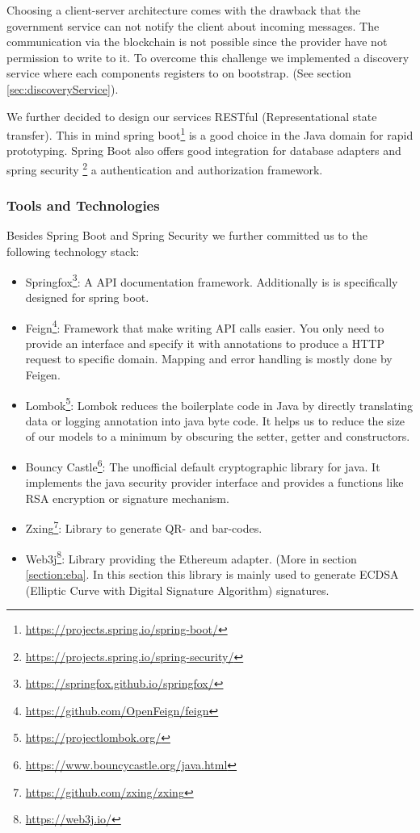 Choosing a client-server architecture comes with the drawback that the government service can not notify the client
about incoming messages. The communication via the blockchain is not possible since the provider have not permission to
write to it. To overcome this challenge we implemented a discovery service where each components registers to on
bootstrap. (See section \ref{sec:discoveryService}).

We further decided to design our services RESTful (Representational state transfer). This in mind spring
boot\footnote{\url{https://projects.spring.io/spring-boot/}} is a good choice in the Java domain for rapid prototyping.
Spring Boot also offers good integration for database adapters and spring security
\footnote{\url{https://projects.spring.io/spring-security/}} a authentication and authorization framework.

\subsubsection{Tools and Technologies}
Besides Spring Boot and Spring Security we further committed us to the following technology stack:

\begin{itemize}
\item Springfox\footnote{\url{https://springfox.github.io/springfox/}}: A API documentation framework. Additionally is is specifically designed for spring boot.
\item Feign\footnote{\url{https://github.com/OpenFeign/feign}}: Framework that make writing API calls easier. You only need to provide an interface and specify it with annotations to produce a HTTP request to specific domain. Mapping and error handling is mostly done by Feigen.
\item Lombok\footnote{\url{https://projectlombok.org/}}: Lombok reduces the boilerplate code in Java by directly translating data or logging annotation into java byte code. It helps us to reduce the size of our models to a minimum by obscuring the setter, getter and constructors. 
\item Bouncy Castle\footnote{\url{https://www.bouncycastle.org/java.html}}: The unofficial default cryptographic library for java. It implements the java security provider interface and provides a functions like RSA encryption or signature mechanism.
\item Zxing\footnote{\url{https://github.com/zxing/zxing}}: Library to generate QR- and bar-codes. 
\item Web3j\footnote{\url{https://web3j.io/}}: Library providing the Ethereum adapter. (More in section \ref{section:eba}. In this section this library is mainly used to generate ECDSA (Elliptic Curve with Digital Signature Algorithm) signatures. 
\end{itemize}


